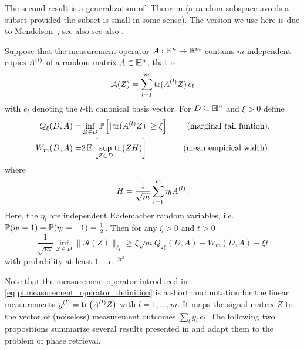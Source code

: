 The second result is a generalization of -Theorem \cite{Gordon_1988_On} (a random subspace avoids a subset provided the subset is small in some sense).
The version we use here is due to Mendelson~\cite{Mendelson_2015_Learning,Koltchinskii_2015_Bounding}, see also see also \cite{Tropp_2014_Convex}.

\begin{theorem}%
  \label{thm:mendelson}
  Suppose that the measurement operator $\mathcal{A}:\mathbb{H}^n \to \mathbb{R}^m$ contains $m$ independent copies $A^{(l)}$ of a random matrix $ A \in \mathbb{H}^n$, that is
  \[
    \label{eq:pl.measurement_operator_definition}
    \mathcal{A}(Z) = \sum_{l=1}^m \operatorname{tr} (A^{(l)}  Z) \,  {e_l}
  \]
  with $e_l$ denoting the $l$-th canonical basis vector.
  For $D \subseteq \mathbb{H}^n$ and $\xi >0$ define
  \begin{align}
    Q_\xi (D,  A) =& \inf_{ Z \in D}\mathbb{P} \left[ | \operatorname{tr} (A^{(l)}  Z) | \geq \xi \right] \quad &\textrm{(marginal tail funtion)}, \label{eq:pl.marginal_tail_function}\\
    W_m (D,  A) =& 2 \, \mathbb{E} \left[ \sup_{ Z \in D} \operatorname{tr} \left(  Z  H \right) \right] \quad &\textrm{(mean empirical width)},
  \end{align}
  where
  \[
    H= \frac{1}{\sqrt{m}} \sum_{l=1}^m \eta_l A^{(l)}.
  \]
  Here, the $\eta_l$ are independent Rademacher random variables, i.e.\ $\mathbb{P}(\eta_l = 1) = \mathbb{P}(\eta_l=-1) = \frac{1}{2}$.
  Then for any $\xi >0$ and $t >0$
  \[
    \frac{1}{\sqrt{m}}\inf_{ Z \in D} \| \mathcal{A}( Z) \|_{\ell_1} \geq \xi \sqrt{m} Q_{2\xi}(D,  A) -  W_m (D,  A)-\xi t \label{eq:pl.mendelson}
  \]
  with probability at least $1-\mathrm{e}^{-2t^2}$.
\end{theorem}

Note that the measurement operator introduced in \cref{eq:pl.measurement_operator_definition} is a shorthand notation for the linear measurements $y^{(l)} = \operatorname{tr}  \left( A^{(l)}  Z \right)$ with $l=1,\ldots,m$.
It maps the signal matrix $Z$ to the vector of (noiseless) measurement outcomes $\sum_l y_l \, {e_l}$.
The following two propositions summarize several results presented in \cite{Kabanava_2015_Stable} and adapt them to the problem of phase retrieval.

